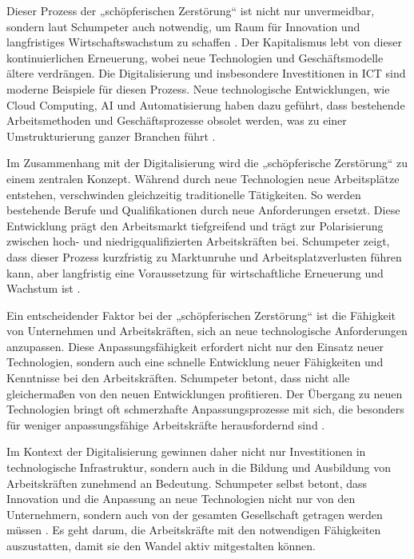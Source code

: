 Dieser Prozess der „schöpferischen Zerstörung“ ist nicht nur unvermeidbar, sondern laut 
Schumpeter auch notwendig, um Raum für Innovation und langfristiges Wirtschaftswachstum zu 
schaffen \parencite[vgl.][S. 83]{schumpeter1976capitalism}. Der Kapitalismus lebt von dieser 
kontinuierlichen Erneuerung, wobei neue Technologien und Geschäftsmodelle ältere verdrängen. 
Die Digitalisierung und insbesondere Investitionen in \ac{ICT} sind moderne Beispiele für 
diesen Prozess. Neue technologische Entwicklungen, wie Cloud Computing, \ac{AI} und 
Automatisierung haben dazu geführt, dass bestehende Arbeitsmethoden und Geschäftsprozesse 
obsolet werden, was zu einer Umstrukturierung ganzer Branchen führt 
\parencite[vgl.][S. 14–15]{frey2013thefuture}.


Im Zusammenhang mit der Digitalisierung wird die „schöpferische Zerstörung“ zu einem 
zentralen Konzept. Während durch neue Technologien neue Arbeitsplätze entstehen, 
verschwinden gleichzeitig traditionelle Tätigkeiten. So werden bestehende Berufe und 
Qualifikationen durch neue Anforderungen ersetzt. Diese Entwicklung prägt den Arbeitsmarkt 
tiefgreifend und trägt zur Polarisierung zwischen hoch- und niedrigqualifizierten 
Arbeitskräften bei. Schumpeter zeigt, dass dieser Prozess kurzfristig zu Marktunruhe und 
Arbeitsplatzverlusten führen kann, aber langfristig eine Voraussetzung für wirtschaftliche 
Erneuerung und Wachstum ist \parencite[vgl.][S. 151–154]{schumpeter1976capitalism}.

Ein entscheidender Faktor bei der „schöpferischen Zerstörung“ ist die Fähigkeit von 
Unternehmen und Arbeitskräften, sich an neue technologische Anforderungen anzupassen. Diese 
Anpassungsfähigkeit erfordert nicht nur den Einsatz neuer Technologien, sondern auch eine 
schnelle Entwicklung neuer Fähigkeiten und Kenntnisse bei den Arbeitskräften. Schumpeter 
betont, dass nicht alle gleichermaßen von den neuen Entwicklungen profitieren. Der Übergang 
zu neuen Technologien bringt oft schmerzhafte Anpassungsprozesse mit sich, die besonders 
für weniger anpassungsfähige Arbeitskräfte herausfordernd sind 
\parencite[vgl.][S. 110–111]{schumpeter1976capitalism}.

Im Kontext der Digitalisierung gewinnen daher nicht nur Investitionen in technologische 
Infrastruktur, sondern auch in die Bildung und Ausbildung von Arbeitskräften zunehmend an 
Bedeutung. Schumpeter selbst betont, dass Innovation und die Anpassung an neue Technologien 
nicht nur von den Unternehmern, sondern auch von der gesamten Gesellschaft getragen werden 
müssen \parencite[vgl.][S. 132]{schumpeter1976capitalism}. Es geht darum, die Arbeitskräfte 
mit den notwendigen Fähigkeiten auszustatten, damit sie den Wandel aktiv mitgestalten 
können. 

